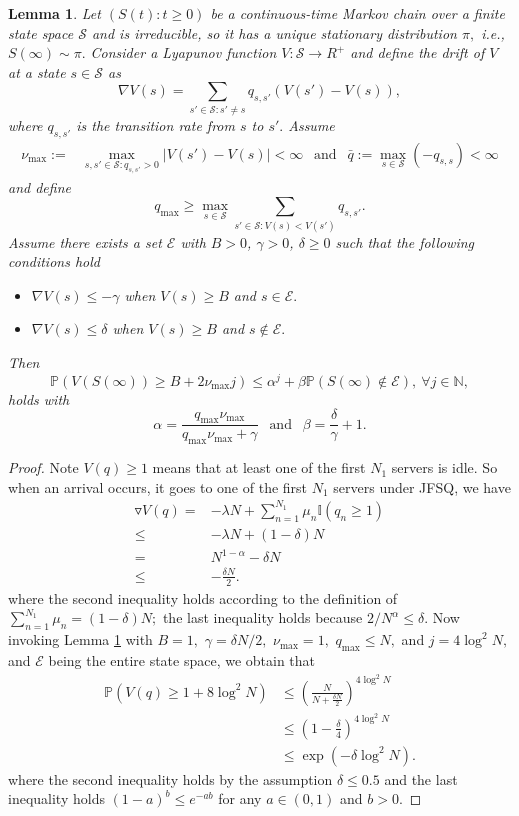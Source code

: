 \documentclass[10pt,a4paper]{amsart}
\newtheorem{lemma}{Lemma}
\begin{document}
\begin{lemma}\label{TailBound}
Let $(S(t): t \geq 0)$ be a continuous-time Markov chain over a finite state space $\mathcal S$ and is irreducible, so it has a unique stationary distribution $\pi,$ {i.e., $S(\infty) \sim \pi.$}  Consider a Lyapunov function $V: \mathcal S \to R^{+}$ and define the drift of $V$ at a state $s \in \mathcal S$ as $$\nabla V(s) = \sum_{s' \in \mathcal S: s' \neq s} q_{s,s'} (V(s') - V(s)),$$ where $q_{s,s'}$ is the transition rate from $s$ to $s'.$ Assume
\begin{align*} 
\nu_{\max} :=& \max\limits_{s,s'\in \mathcal S: q_{s,s'} >0} |V(s') - V(s)|< \infty ~~ \text{ and } ~~ \bar q := \max\limits_{s \in \mathcal S} (-q_{s,s}) < \infty 
\end{align*}
and define $$q_{\max}\geq \max\limits_{s \in \mathcal S} \sum_{s' \in \mathcal S: V(s) < V(s')} q_{s,s'}.$$
Assume there exists a set $\mathcal E$ with $B>0$, $\gamma>0$, $\delta \geq 0$ such that the following conditions hold
\begin{itemize}
\item $\nabla V(s) \leq -\gamma$ when $V(s) \geq B$ and $s \in \mathcal E.$
\item $\nabla V(s) \leq \delta$ when $V(s) \geq B$ and $s \notin \mathcal E.$
\end{itemize}
Then $$\mathbb P \left(V(S(\infty))\geq B + 2 \nu_{\max} j \right) \leq \alpha^j + \beta \mathbb P\left(S(\infty) \notin \mathcal E\right), ~ \forall j \in \mathbb{N},$$
holds with $$\alpha = \frac{q_{\max}\nu_{\max}}{q_{\max}\nu_{\max} + \gamma} ~~\text{ and }~~ \beta = \frac{\delta}{\gamma}+1.$$
\end{lemma}

\begin{proof}
Note $V(q)\geq 1$ means that at least one of the first $N_1$ servers is idle.  So when an arrival occurs, it goes to one of the first $N_1$ servers under JFSQ, we have
\begin{align*}
\triangledown V(q) = & -\lambda N +\sum_{n=1}^{N_1}\mu_n \mathbb{I}(q_n\geq 1)\\
\leq & -\lambda N + (1-\delta) N\\
= & N^{1-\alpha}-\delta N\\
\leq & -\frac{\delta N}{2}.
\end{align*}
where the second inequality holds according to the definition of $\sum_{n=1}^{N_1} \mu_n = (1-\delta)N;$ the last inequality holds because $2/N^\alpha\leq \delta.$ Now invoking Lemma \ref{TailBound} with $B=1,$ $\gamma= {\delta N}/{2},$ $\nu_{\max}=1,$ $q_{\max}\leq N,$ and $j=4\log^2 N,$ and $\mathcal E$ being the entire state space, we obtain that 
\begin{align*}
  \mathbb P\left(V(q)\geq 1+ 8\log^2 N \right)&\leq \left(\frac{N}{N+\frac{\delta N}{2}}\right)^{4\log^2 N}\\ 
   &\leq \left(1- \frac{\delta}{4}\right)^{ 4\log^2 N}\\
   &\leq \exp\left(- \delta \log^2 N\right).
\end{align*}
where the second inequality holds by the assumption $\delta \leq 0.5$ and the last inequality holds $(1-a)^b\leq e^{-ab}$ for any $a\in (0,1)$ and $b>0.$
\end{proof}
\end{document}
